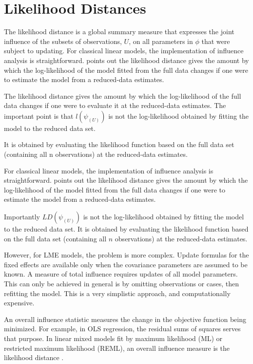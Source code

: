 \documentclass[12pt, a4paper]{report}
\theoremstyle{plain}
\theoremstyle{definition}
\theoremstyle{remark}
\begin{document}
\section{Likelihood Distances}

The  likelihood distance is a global summary measure that expresses the joint influence of the subsets of observations, $U$, on all parameters in $\phi$ that were subject to updating. For classical linear models, the implementation of influence analysis is straightforward. \citet{schabenberger} points out the likelihood distance gives the amount by which the log-likelihood of the model fitted from the full data changes if one were
to estimate the model from a reduced-data estimates. 

The likelihood distance gives the amount by which the log-likelihood of the full data changes if one were to evaluate it at the reduced-data estimates. The important point is that $l(\psi_{(U)})$ is not the log-likelihood obtained by fitting the model to the reduced data set.

It is obtained by evaluating the likelihood function based on the full data set (containing all n observations) at the reduced-data estimates.



For classical linear models, the implementation of influence analysis is straightforward. \citet{schab} points out the likelihood distance gives the amount by which the log-likelihood of the model fitted from the full data changes if one were to estimate the model from a reduced-data estimates. 

Importantly $LD(\psi_{(U)})$ is not the log-likelihood obtained by fitting the model to the reduced data set. It is obtained by evaluating the likelihood function based on the full data set (containing all $n$ observations) at the reduced-data estimates.


However, for LME models, the problem is more complex. Update formulas for the fixed effects are available only when the covariance parameters are assumed to be known. A measure of total influence requires updates of all model parameters. This can only be achieved in general is by omitting observations or cases, then refitting the model. This is a very simplistic approach, and computationally expensive.



An overall influence statistic measures the change in the objective function being minimized. For example, in
OLS regression, the residual sums of squares serves that purpose. In linear mixed models fit by
 maximum likelihood (ML) or  restricted maximum likelihood (REML), an overall influence measure is the  likelihood distance \citep{cook}. 
\end{document}
